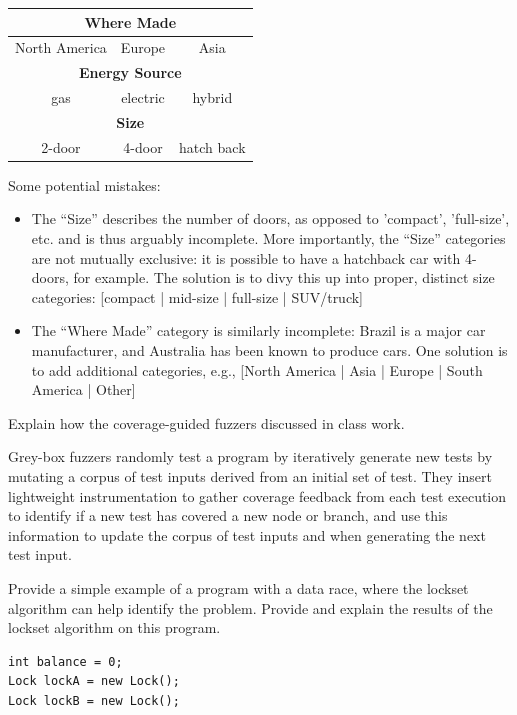 \documentclass[addpoints, answers]{exam}
\begin{document}
\begin{questions}
  \begin{center}
  \begin{tabular}{|c|c|c|}
    \hline
    \multicolumn{3}{|c|}{\textbf{Where Made}} \\\hline
    North America & Europe & Asia \\\hline
    \multicolumn{3}{|c|}{\textbf{Energy Source}} \\\hline
    gas & electric & hybrid \\\hline
    \multicolumn{3}{|c|}{\textbf{Size}}\\\hline
    2-door & 4-door & hatch back\\\hline
  \end{tabular}
\end{center}
\begin{solution}
  Some potential mistakes:
  \begin{itemize}
  \item The ``Size'' describes the number of doors, as opposed to
    'compact', 'full-size', etc. and is thus arguably incomplete. More
    importantly, the ``Size'' categories are not mutually exclusive:
    it is possible to have a hatchback car with 4-doors, for
    example. The solution is to divy this up into proper, distinct
    size categories: [compact | mid-size | full-size | SUV/truck]
  \item The ``Where Made'' category is similarly incomplete: Brazil is
    a major car manufacturer, and Australia has been known to produce
    cars. One solution is to add additional categories, e.g.,
    [North America | Asia | Europe | South America | Other]
  \end{itemize}
\end{solution}

\newpage

\question Explain how the coverage-guided fuzzers discussed in class work.
\begin{solution} Grey-box fuzzers randomly test a program by
  iteratively generate new tests by mutating a corpus of test inputs
  derived from an initial set of test. They insert lightweight
  instrumentation to gather coverage feedback from each test execution
  to identify if a new test has covered a new node or branch, and use
  this information to update the corpus of test inputs and when
  generating the next test input.
  \end{solution}

  \newpage

\question
  Provide a simple example of a program with a data race, where the
  lockset algorithm can help identify the problem. Provide and explain
  the results of the lockset algorithm on this program. %
  \begin{solution}
    \begin{verbatim}
int balance = 0;
Lock lockA = new Lock();
Lock lockB = new Lock();


\end{verbatim}
\end{solution}
\end{questions}
\end{document}
